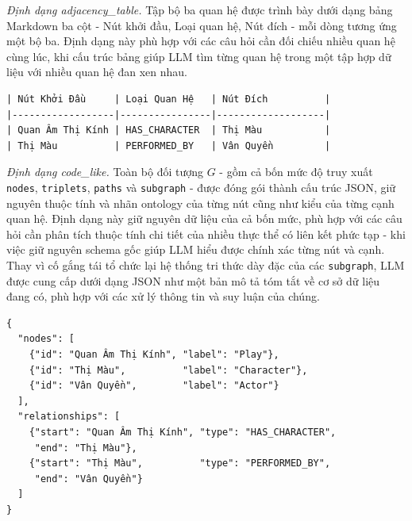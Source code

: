 \textit{Định dạng adjacency\_table.} Tập bộ ba quan hệ được trình bày dưới dạng bảng Markdown ba cột - Nút khởi đầu, Loại quan hệ, Nút đích - mỗi dòng tương ứng một bộ ba. Định dạng này phù hợp với các câu hỏi cần đối chiếu nhiều quan hệ cùng lúc, khi cấu trúc bảng giúp LLM tìm từng quan hệ trong một tập hợp dữ liệu với nhiều quan hệ đan xen nhau.

\vspace{0.5em}
\begin{tcolorbox}[colback=gray!5, colframe=black!50, arc=4pt, boxrule=0.5pt, left=4pt, right=4pt, top=4pt, bottom=4pt, boxsep=0pt]
\small
\begin{verbatim}
| Nút Khởi Đầu     | Loại Quan Hệ   | Nút Đích          |
|------------------|----------------|-------------------|
| Quan Âm Thị Kính | HAS_CHARACTER  | Thị Màu           |
| Thị Màu          | PERFORMED_BY   | Vân Quyền         |
\end{verbatim}
\end{tcolorbox}

\textit{Định dạng code\_like.} Toàn bộ đối tượng $G$ - gồm cả bốn mức độ truy xuất \texttt{nodes}, \texttt{triplets}, \texttt{paths} và \texttt{subgraph} - được đóng gói thành cấu trúc JSON, giữ nguyên thuộc tính và nhãn ontology của từng nút cũng như kiểu của từng cạnh quan hệ. Định dạng này giữ nguyên dữ liệu của cả bốn mức, phù hợp với các câu hỏi cần phân tích thuộc tính chi tiết của nhiều thực thể có liên kết phức tạp - khi việc giữ nguyên schema gốc giúp LLM hiểu được chính xác từng nút và cạnh. Thay vì cố gắng tái tổ chức lại hệ thống tri thức dày đặc của các \texttt{subgraph}, LLM được cung cấp dưới dạng JSON như một bản mô tả tóm tắt về cơ sở dữ liệu đang có, phù hợp với các xử lý thông tin và suy luận của chúng.

\vspace{0.5em}
\begin{tcolorbox}[colback=gray!5, colframe=black!50, arc=4pt, boxrule=0.5pt, left=4pt, right=4pt, top=4pt, bottom=4pt, boxsep=0pt]
\small
\begin{verbatim}
{
  "nodes": [
    {"id": "Quan Âm Thị Kính", "label": "Play"},
    {"id": "Thị Màu",          "label": "Character"},
    {"id": "Vân Quyền",        "label": "Actor"}
  ],
  "relationships": [
    {"start": "Quan Âm Thị Kính", "type": "HAS_CHARACTER",
     "end": "Thị Màu"},
    {"start": "Thị Màu",          "type": "PERFORMED_BY",
     "end": "Vân Quyền"}
  ]
}
\end{verbatim}
\end{tcolorbox}

